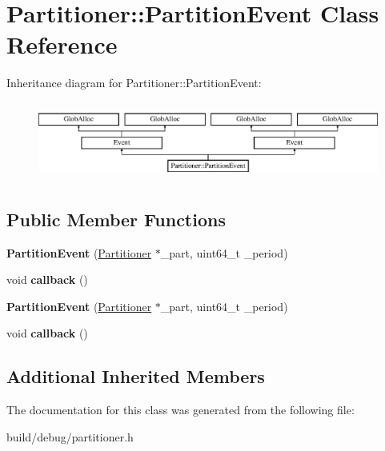 \hypertarget{classPartitioner_1_1PartitionEvent}{\section{Partitioner\-:\-:Partition\-Event Class Reference}
\label{classPartitioner_1_1PartitionEvent}
}
Inheritance diagram for Partitioner\-:\-:Partition\-Event\-:\begin{figure}[H]
\begin{center}
\leavevmode
\includegraphics[height=2.592592cm]{classPartitioner_1_1PartitionEvent}
\end{center}
\end{figure}
\subsection*{Public Member Functions}
\begin{DoxyCompactItemize}
\item 
\hypertarget{classPartitioner_1_1PartitionEvent_a278b04cf2f7cee7d0a9811a67fb0aa68}{{\bfseries Partition\-Event} (\hyperlink{classPartitioner}{Partitioner} $\ast$\-\_\-part, uint64\-\_\-t \-\_\-period)}\label{classPartitioner_1_1PartitionEvent_a278b04cf2f7cee7d0a9811a67fb0aa68}

\item 
\hypertarget{classPartitioner_1_1PartitionEvent_a3044e46efce3cf81b0c20aa21584675b}{void {\bfseries callback} ()}\label{classPartitioner_1_1PartitionEvent_a3044e46efce3cf81b0c20aa21584675b}

\item 
\hypertarget{classPartitioner_1_1PartitionEvent_a278b04cf2f7cee7d0a9811a67fb0aa68}{{\bfseries Partition\-Event} (\hyperlink{classPartitioner}{Partitioner} $\ast$\-\_\-part, uint64\-\_\-t \-\_\-period)}\label{classPartitioner_1_1PartitionEvent_a278b04cf2f7cee7d0a9811a67fb0aa68}

\item 
\hypertarget{classPartitioner_1_1PartitionEvent_a3044e46efce3cf81b0c20aa21584675b}{void {\bfseries callback} ()}\label{classPartitioner_1_1PartitionEvent_a3044e46efce3cf81b0c20aa21584675b}

\end{DoxyCompactItemize}
\subsection*{Additional Inherited Members}


The documentation for this class was generated from the following file\-:\begin{DoxyCompactItemize}
\item 
build/debug/partitioner.\-h\end{DoxyCompactItemize}
